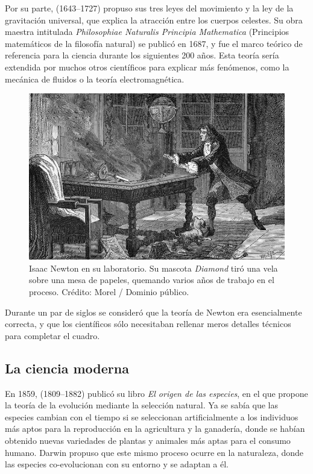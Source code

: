 Por su parte,  (1643--1727) propuso sus tres
leyes del movimiento y la ley de la gravitación universal, que explica la
atracción entre los cuerpos celestes.
Su obra maestra intitulada \emph{Philosophiae Naturalis Principia Mathematica}
(Principios matemáticos de la filosofía natural) se publicó en 1687, y fue el
marco teórico de referencia para la ciencia durante los siguientes 200 años.
Esta teoría sería extendida por muchos otros científicos para explicar más
fenómenos, como la mecánica de fluidos o la teoría electromagnética.

\begin{figure}[ht]
    \centering
    \includegraphics[width=0.8\linewidth]{img/Isaac_Newton_laboratory_fire}
    \caption{Isaac Newton en su laboratorio.
        Su mascota \emph{Diamond} tiró una vela sobre una mesa de papeles,
        quemando varios años de trabajo en el proceso.
        Crédito: Morel / Dominio público.
    }

\end{figure}

Durante un par de siglos se consideró que la teoría de Newton era esencialmente
correcta, y que los científicos sólo necesitaban rellenar meros detalles
técnicos para completar el cuadro.

\subsection*{La ciencia moderna}
\label{sub:lacienciamoderna}
En 1859,  (1809--1882) publicó su libro
\emph{El origen de las especies}, en el que propone la teoría de la evolución
mediante la selección natural.
Ya se sabía que las especies cambian con el tiempo si se seleccionan
artificialmente a los individuos más aptos para la reproducción en la
agricultura y la ganadería, donde se habían obtenido nuevas variedades de
plantas y animales más aptas para el consumo humano.
Darwin propuso que este mismo proceso ocurre en la naturaleza, donde las
especies co-evolucionan con su entorno y se adaptan a él.


